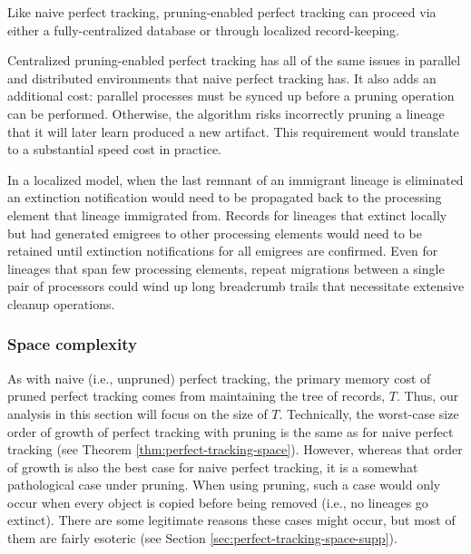 Like naive perfect tracking, pruning-enabled perfect tracking can proceed via either a fully-centralized database or through localized record-keeping.

Centralized pruning-enabled perfect tracking has all of the same issues in parallel and distributed environments that naive perfect tracking has.
It also adds an additional cost: parallel processes must be synced up before a pruning operation can be performed.
Otherwise, the algorithm risks incorrectly pruning a lineage that it will later learn produced a new artifact.
This requirement would translate to a substantial speed cost in practice.

In a localized model, when the last remnant of an immigrant lineage is eliminated an extinction notification would need to be propagated back to the processing element that lineage immigrated from.
Records for lineages that extinct locally but had generated emigrees to other processing elements would need to be retained until extinction notifications for all emigrees are confirmed.
Even for lineages that span few processing elements, repeat migrations between a single pair of processors could wind up long breadcrumb trails that necessitate extensive cleanup operations.

\subsubsection{Space complexity}
\label{sec:perfect-tracking-pruning-space}

As with naive (i.e., unpruned) perfect tracking, the primary memory cost of pruned perfect tracking comes from maintaining the tree of records, $T$.
Thus, our analysis in this section will focus on the size of $T$.
Technically, the worst-case size order of growth of perfect tracking with pruning is the same as for naive perfect tracking (see Theorem \ref{thm:perfect-tracking-space}).
However, whereas that order of growth is also the best case for naive perfect tracking, it is a somewhat pathological case under pruning.
When using pruning, such a case would only occur when every object is copied before being removed (i.e., no lineages go extinct).
There are some legitimate reasons these cases might occur, but most of them are fairly esoteric (see Section \ref{sec:perfect-tracking-space-supp}).

